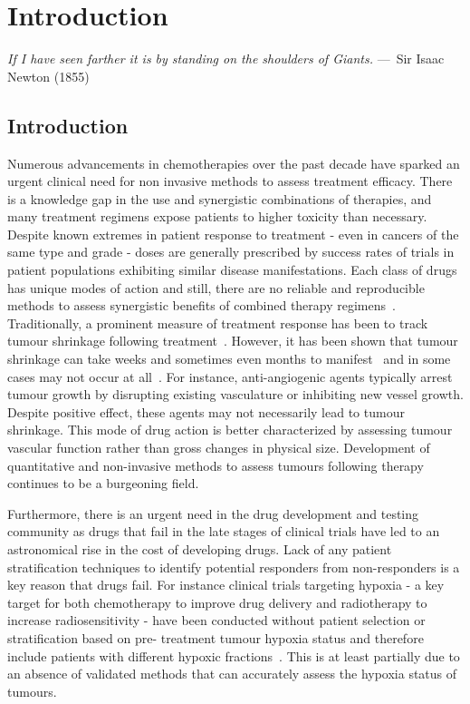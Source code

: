 
\chapter{Introduction}
\label{ch:Introduction}

\begin{epigraph}
    \emph{If I have seen farther it is by standing on the shoulders of
    Giants.} ---~Sir Isaac Newton (1855)
\end{epigraph}

\section{Introduction}

Numerous advancements in chemotherapies over the past decade have sparked an urgent clinical need
for non invasive methods to assess treatment efficacy. There is a knowledge gap in the use and
synergistic combinations of therapies, and many treatment regimens expose patients to higher
toxicity than necessary. Despite known extremes in patient response to treatment - even in cancers
of the same type and grade - doses are generally prescribed by success rates of trials in patient
populations exhibiting similar disease manifestations. Each class of drugs has unique modes of
action and still, there are no reliable and reproducible methods to assess synergistic benefits of
combined therapy regimens~\cite{Zhang:2008vi}. Traditionally, a prominent measure of treatment
response has been to track tumour shrinkage following treatment~\cite{Tuma:2006hx}. However, it has
been shown that tumour shrinkage can take weeks and sometimes even months to
manifest~\cite{Brindle:2008tb} and in some cases may not occur at all~\cite{Kitzen:2008un}. For
instance, anti-angiogenic agents typically arrest tumour growth by disrupting existing vasculature
or inhibiting new vessel growth. Despite positive effect, these agents may not necessarily lead to
tumour shrinkage. This mode of drug action is better characterized by assessing tumour vascular
function rather than gross changes in physical size. Development of quantitative and non-invasive
methods to assess tumours following therapy continues to be a burgeoning field.

Furthermore, there is an urgent need in the drug development and testing community as drugs that
fail in the late stages of clinical trials have led to an astronomical rise in the cost of
developing drugs. Lack of any patient stratification techniques to identify potential responders
from non-responders is a key reason that drugs fail. For instance clinical trials targeting hypoxia
- a key target for both chemotherapy to improve drug delivery and radiotherapy to increase
radiosensitivity - have been conducted without patient selection or stratification based on pre-
treatment tumour hypoxia status and therefore include patients with different hypoxic
fractions~\cite{Overgaard:2011ji}. This is at least partially due to an absence of validated methods
that can accurately assess the hypoxia status of tumours.


